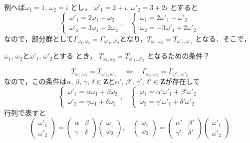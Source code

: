 例へば$\omega_1=1$, $\omega_2=i$ とし，
$\omega'_1=2+i$, $\omega'_2=3+2i$ とすると
\[
	\begin{cases}
		\omega'_1=2\omega_1+\omega_2\\
		\omega'_2=3\omega_1+2\omega_2
	\end{cases},
	\quad
	\begin{cases}
		\omega_1=2\omega'_1-\omega'_2\\
		\omega_2=-3\omega'_1+2\omega'_2
	\end{cases}
\]
なので，部分群として$\Gamma_{\omega_1,\omega_2}=\Gamma_{\omega'_1,\omega'_2}$となり，$T_{\omega_1,\omega_2}=T_{\omega'_1,\omega'_2}$
となる．そこで，

\begin{Q}
$\omega_1$, $\omega_2$と$\omega'_1$, $\omega'_2$とする
とき，
$
	T_{\omega_1,\omega_2}=T_{\omega'_1,\omega'_2}
$
となるための条件？
\end{Q}
\[
	T_{\omega_1,\omega_2}=T_{\omega'_1,\omega'_2}\quad
	\Leftrightarrow\quad
	\Gamma_{\omega_1,\omega_2}= 
	\Gamma_{\omega'_1,\omega'_2}
\]
なので，この条件は$\alpha$, $\beta$, $\gamma$, $\delta\in\mathbf Z$と$\alpha'$, $\beta'$, $\gamma'$, $\delta'\in\mathbf Z$が存在して
\begin{equation}\label{moduler}
	\begin{cases}
		\omega'_1=\alpha\omega_1+\beta\omega_2\\
		\omega'_2=\gamma\omega_1+\delta\omega_2
	\end{cases}, 
	\quad
	\begin{cases}
		\omega_1=\alpha'\omega'_1+\beta'\omega'_2\\
		\omega_2=\gamma'\omega'_1+\delta'\omega'_2
	\end{cases}. 
\end{equation}
行列で表すと
\[
	\begin{pmatrix}
		\omega'_1\\
		\omega'_2
	\end{pmatrix}
	=
	\begin{pmatrix}
		\alpha&\beta\\
		\gamma&\delta
	\end{pmatrix}
	\begin{pmatrix}
		\omega_1\\
		\omega_2
	\end{pmatrix}, 
	\quad
	\begin{pmatrix}
		\omega_1\\
		\omega_2
	\end{pmatrix}
	=
	\begin{pmatrix}
		\alpha'&\beta'\\
		\gamma'&\delta'
	\end{pmatrix}
	\begin{pmatrix}
		\omega'_1\\
		\omega'_2
	\end{pmatrix}
\]
